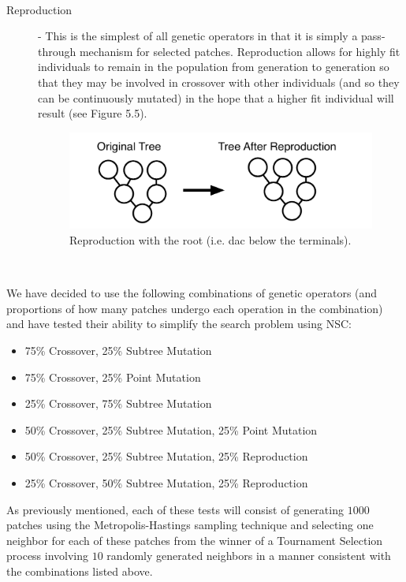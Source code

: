 \documentclass[a4paper,12pt]{report} 	%
\numberwithin{figure}{chapter}
\numberwithin{table}{chapter}
\numberwithin{equation}{chapter}
\begin{document}
\begin{flushleft}
\begin{description}
\begin{figure}[h!]
\begin{center}
\end{center}
\end{figure}
\\
\item[Reproduction] - This is the simplest of all genetic operators in that it is simply a pass-through mechanism for selected patches. Reproduction allows for highly fit individuals to remain in the population from generation to generation so that they may be involved in crossover with other individuals (and so they can be continuously mutated) in the hope that a higher fit individual will result (see Figure 5.5).
\begin{figure}[h!]
\begin{center}
\includegraphics[scale=0.5]{Reproduction}
\caption[Reproduction]{Reproduction with the root (i.e. dac\texttildelow{} below the terminals).}
\end{center}
\end{figure}
\\
\end{description}

We have decided to use the following combinations of genetic operators (and proportions of how many patches undergo each operation in the combination) and have tested their ability to simplify the search problem using NSC:

\begin{itemize}
\item 75\% Crossover, 25\% Subtree Mutation
\item 75\% Crossover, 25\% Point Mutation
\item 25\% Crossover, 75\% Subtree Mutation
\item 50\% Crossover, 25\% Subtree Mutation, 25\% Point Mutation
\item 50\% Crossover, 25\% Subtree Mutation, 25\% Reproduction
\item 25\% Crossover, 50\% Subtree Mutation, 25\% Reproduction
\end{itemize}
As previously mentioned, each of these tests will consist of generating $1000$ patches using the Metropolis-Hastings sampling technique and selecting one neighbor for each of these patches from the winner of a Tournament Selection process involving $10$ randomly generated neighbors in a manner consistent with the combinations listed above.


\end{flushleft}
\end{document}
